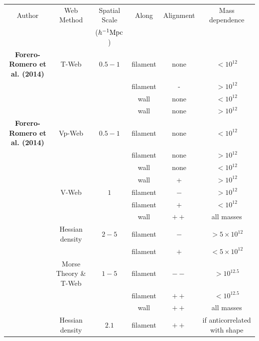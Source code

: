 \documentclass[useAMS,usenatbib]{mn2e}
\newcommand{\hMpc}{{\ifmmode{h^{-1}{\rm Mpc}}\else{$h^{-1}$Mpc }\fi}}
\newcommand{\hMsun}{{\ifmmode{h^{-1}{\rm
        {M_{\odot}}}}\else{$h^{-1}{\rm{M_{\odot}}}$~}\fi}}
\begin{document}
\begin{table}
\begin{tabular}{cccccc}\hline\hline
Author & Web Method & Spatial Scale& Along &
Alignment & Mass dependence\\
 & & ($\hMpc$)& & & \\\hline

{\bf Forero-Romero et al. (2014)} & T-Web & $0.5-1$ & 
filament &none & $<10^{12}$\hMsun\\

&   & & 
filament & - & $>10^{12}$\hMsun\\

&   & & 
wall & none & $<10^{12}$\hMsun\\

&   & & 
wall & none & $>10^{12}$\hMsun\\\hline

{\bf Forero-Romero et al. (2014)} & Vp-Web & $0.5-1$ & 
filament &none & $<10^{12}$\hMsun\\

&   & & 
filament & none & $>10^{12}$\hMsun\\

&   & & 
wall & none & $<10^{12}$\hMsun\\

&   & & 
wall & + & $>10^{12}$\hMsun\\\hline

\cite{Libeskind2013} & V-Web & $1$ & 
filament &$-$ & $>10^{12}$\hMsun\\

&   & & 
filament &$+$ & $<10^{12}$\hMsun\\

&   & & 
wall & $++$ & all masses\\\hline

\cite{Trowland2013} & Hessian density & $2-5$ & 
filament & $-$ & $> 5\times 10^{12}$\hMsun\\
&   & & 
filament & $+$ & $< 5\times 10^{12}$\hMsun\\\hline

\cite{Codis2012} & Morse Theory \& T-Web & $1-5$ & 
filament & $--$ & $>10^{12.5}$\hMsun \\ 

&   & & 
filament & $++$ & $<10^{12.5}$\hMsun \\ 

& & & 
wall & $++$ & all masses\\\hline

\cite{Zhang2009}  & Hessian density &  $2.1$ & 
filament & $++$ & if anticorrelated with shape\\


\end{tabular}
\end{table}
\end{document}
